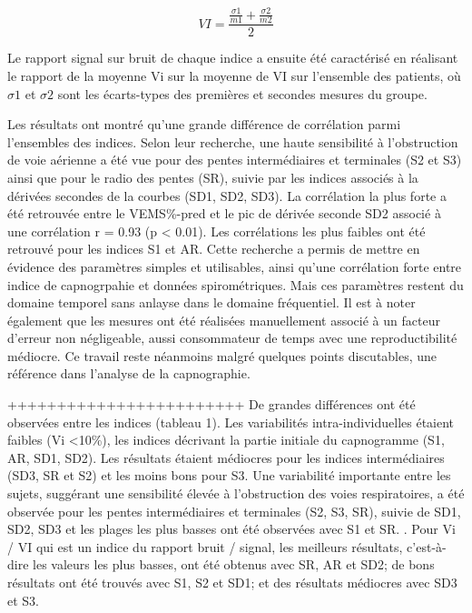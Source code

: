 \documentclass[12pt,]{article}
\begin{document}
\begin{equation}
  VI=\frac{\frac{\sigma1}{m1}+\frac{\sigma2}{m2}}{2}
\label{eq:VI}
\end{equation}

Le rapport signal sur bruit de chaque indice a ensuite été caractérisé
en réalisant le rapport de la moyenne Vi sur la moyenne de VI sur
l'ensemble des patients, où \(\sigma1\) et \(\sigma2\) sont les
écarts-types des premières et secondes mesures du groupe.

Les résultats ont montré qu'une grande différence de corrélation parmi
l'ensembles des indices. Selon leur recherche, une haute sensibilité à
l'obstruction de voie aérienne a été vue pour des pentes intermédiaires
et terminales (S2 et S3) ainsi que pour le radio des pentes (SR), suivie
par les indices associés à la dérivées secondes de la courbes (SD1, SD2,
SD3). La corrélation la plus forte a été retrouvée entre le VEMS\%-pred
et le pic de dérivée seconde SD2 associé à une corrélation r = 0.93 (p
\textless{} 0.01). Les corrélations les plus faibles ont été retrouvé
pour les indices S1 et AR. Cette recherche a permis de mettre en
évidence des paramètres simples et utilisables, ainsi qu'une corrélation
forte entre indice de capnogrpahie et données spirométriques. Mais ces
paramètres restent du domaine temporel sans anlayse dans le domaine
fréquentiel. Il est à noter également que les mesures ont été réalisées
manuellement associé à un facteur d'erreur non négligeable, aussi
consommateur de temps avec une reproductibilité médiocre. Ce travail
reste néanmoins malgré quelques points discutables, une référence dans
l'analyse de la capnographie.

++++++++++++++++++++++++ De grandes différences ont été observées entre
les indices (tableau 1). Les variabilités intra-individuelles étaient
faibles (Vi \textless{}10\%), les indices décrivant la partie initiale
du capnogramme (S1, AR, SD1, SD2). Les résultats étaient médiocres pour
les indices intermédiaires (SD3, SR et S2) et les moins bons pour S3.
Une variabilité importante entre les sujets, suggérant une sensibilité
élevée à l'obstruction des voies respiratoires, a été observée pour les
pentes intermédiaires et terminales (S2, S3, SR), suivie de SD1, SD2,
SD3 et les plages les plus basses ont été observées avec S1 et SR. .
Pour Vi / VI qui est un indice du rapport bruit / signal, les meilleurs
résultats, c'est-à-dire les valeurs les plus basses, ont été obtenus
avec SR, AR et SD2; de bons résultats ont été trouvés avec S1, S2 et
SD1; et des résultats médiocres avec SD3 et S3.
\end{document}
